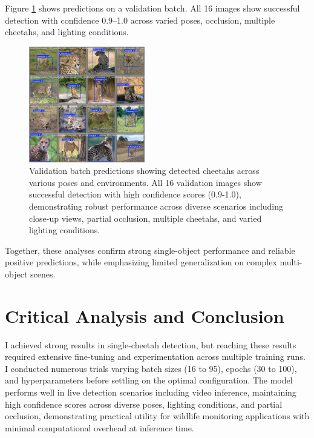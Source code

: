 \documentclass[conference]{IEEEtran}
\begin{document}
Figure \ref{fig:validation_batch} shows predictions on a validation batch. All 16 images show successful detection with confidence 0.9–1.0 across varied poses, occlusion, multiple cheetahs, and lighting conditions.

\begin{figure}[htbp]
\centerline{\includegraphics[width=0.45\textwidth]{validation_predictions.png}}
\caption{Validation batch predictions showing detected cheetahs across various poses and environments. All 16 validation images show successful detection with high confidence scores (0.9-1.0), demonstrating robust performance across diverse scenarios including close-up views, partial occlusion, multiple cheetahs, and varied lighting conditions.}
\label{fig:validation_batch}
\end{figure}

Together, these analyses confirm strong single-object performance and reliable positive predictions, while emphasizing limited generalization on complex multi-object scenes.

\section{Critical Analysis and Conclusion}

I achieved strong results in single-cheetah detection, but reaching these results required extensive fine-tuning and experimentation across multiple training runs. I conducted numerous trials varying batch sizes (16 to 95), epochs (30 to 100), and hyperparameters before settling on the optimal configuration. The model performs well in live detection scenarios including video inference, maintaining high confidence scores across diverse poses, lighting conditions, and partial occlusion, demonstrating practical utility for wildlife monitoring applications with minimal computational overhead at inference time.
\end{document}
